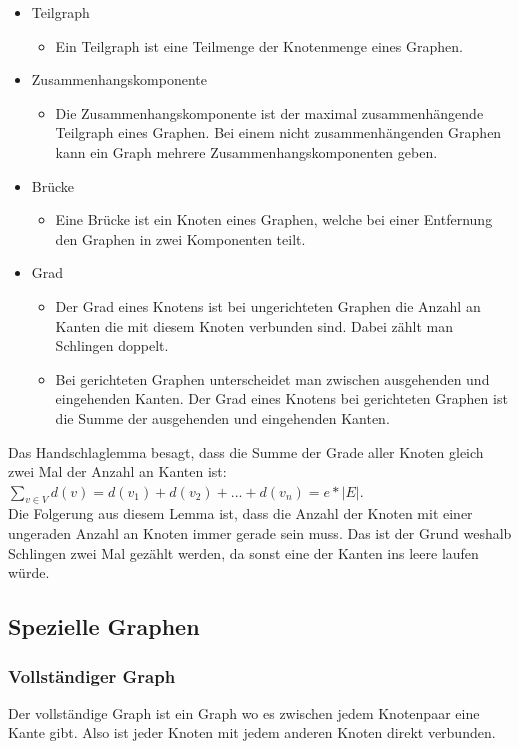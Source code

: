 \documentclass{article}
\begin{document}
	\begin{itemize}
		\item{Teilgraph}
		\begin{itemize}
			\item{Ein Teilgraph ist eine Teilmenge der Knotenmenge eines Graphen.}
		\end{itemize}
		\item{Zusammenhangskomponente}
		\begin{itemize}
			\item{Die Zusammenhangskomponente ist der maximal zusammenhängende Teilgraph eines Graphen. Bei einem nicht zusammenhängenden Graphen kann ein Graph mehrere Zusammenhangskomponenten geben.}
		\end{itemize}
		\item{Brücke}
		\begin{itemize}
			\item{Eine Brücke ist ein Knoten eines Graphen, welche bei einer Entfernung den Graphen in zwei Komponenten teilt.}
		\end{itemize}
		\item{Grad}
		\begin{itemize}
			\item{Der Grad eines Knotens ist bei ungerichteten Graphen die Anzahl an Kanten die mit diesem Knoten verbunden sind. Dabei zählt man Schlingen doppelt.}
			\item{Bei gerichteten Graphen unterscheidet man zwischen ausgehenden und eingehenden Kanten. Der Grad eines Knotens bei gerichteten Graphen ist die Summe der ausgehenden und eingehenden Kanten.}
		\end{itemize}
	\end{itemize}
	Das Handschlaglemma besagt, dass die Summe der Grade aller Knoten gleich zwei Mal der Anzahl an Kanten ist: $\sum_{v\in V}d(v)=d(v_1)+d(v_2)+...+d(v_n)=e*|E|$. \\
	Die Folgerung aus diesem Lemma ist, dass die Anzahl der Knoten mit einer ungeraden Anzahl an Knoten immer gerade sein muss. Das ist der Grund weshalb Schlingen zwei Mal gezählt werden, da sonst eine der Kanten ins leere laufen würde. 
	\subsection{Spezielle Graphen}
	\subsubsection{Vollständiger Graph}
	Der vollständige Graph ist ein Graph wo es zwischen jedem Knotenpaar eine Kante gibt. Also ist jeder Knoten mit jedem anderen Knoten direkt verbunden.
\end{document}
